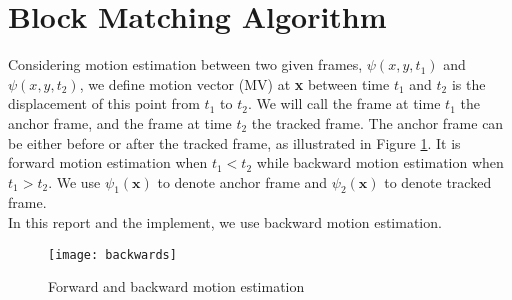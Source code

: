 \documentclass[a4paper, twocolumn]{article}
\begin{document}
	\section{Block Matching Algorithm}
	Considering motion estimation between two given frames, $ \psi(x,y, t_{1}) $ and $ \psi(x,y,t_{2}) $, we define motion vector (MV) at \textbf{x} between time $ t_{1} $ and $ t_{2} $ is the displacement of this point from $ t_{1} $ to $ t_{2} $. We will call the frame at time $ t_{1} $ the anchor frame, and the frame at time $ t_{2} $ the tracked frame. The anchor frame can be either before or after the tracked frame, as illustrated in Figure \ref{fig:backwards}. It is forward motion estimation when $ t_{1} < t_{2} $ while backward motion estimation when $ t_{1} > t_{2} $. We use $ \psi_{1}(\textbf{x}) $ to denote anchor frame and $ \psi_{2}(\textbf{x}) $ to denote tracked frame. \\
	In this report and the implement, we use backward motion estimation.
	\begin{figure}[h]
	\centering
	\texttt{[image: backwards]}
	\caption{Forward and backward motion estimation}
	\label{fig:backwards}
	\end{figure}
\end{document}
